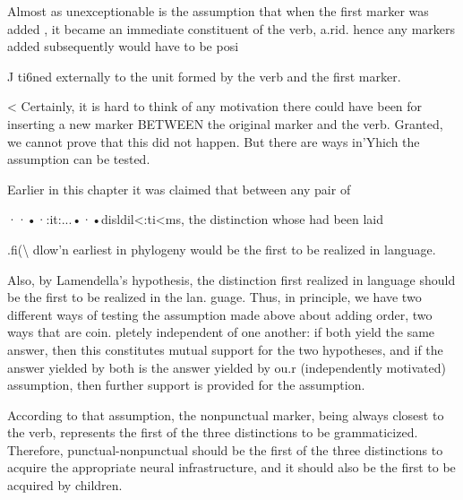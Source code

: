Almost as unexceptionable is the assumption that when the first marker was added , it became an immediate constituent of the verb, a.rid. hence any markers added subsequently would have to be posi{\textquotedbl}

J ti6ned externally to the unit formed by the verb and the first marker.

{\textless} Certainly, it is hard to think of any motivation there could have been for inserting a new marker BETWEEN the original marker and the verb. Granted, we cannot prove that this did not happen. But there are ways in'Yhich the assumption can be tested.

Earlier in this chapter it was claimed that between any pair of

··•·:it:...•·•disldil{\textless}:ti{\textless}ms, the distinction whose  had been laid

.fi({\textbackslash} dlow'n earliest in phylogeny would be the first to be realized in language.


Also, by Lamendella's hypothesis, the distinction first realized in language should be the first to be realized in the  lan. guage. Thus, in principle, we have two different ways of testing the assumption made above about adding order, two ways that are coin. pletely independent of one another: if both yield the same answer, then this constitutes mutual support for the two hypotheses, and if the answer yielded by both is the answer yielded by ou.r (indepen\-dently motivated) assumption, then further support is provided for the assumption.

According to that assumption, the nonpunctual marker, being always closest to the verb, represents the first of the three distinctions to be grammaticized. Therefore, punctual-nonpunctual should be the first of the three distinctions to acquire the appropriate neural infra\-structure, and it should also be the first to be acquired by children.

